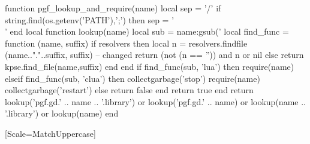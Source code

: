\usepackage[hidelinks]{hyperref}
\usepackage{longtable}
\usepackage{booktabs}
\usepackage{biocon}
\usepackage{graphicx}
\usepackage{fancyhdr}
\usepackage[T1]{fontenc}
\usepackage[francais]{babel}
\usepackage{caption}
\usepackage[nointegrals]{wasysym} %
\usepackage[margin=2.5cm]{geometry}
\usepackage{latexsym}
\usepackage{subcaption}
\usepackage{tikz}
\usepackage{tikzscale}
\usetikzlibrary{graphs}
\usetikzlibrary{graphdrawing}
\usetikzlibrary{arrows,positioning,decorations.pathreplacing}
\usetikzlibrary{calc}

\usepackage{luacode}
\begin{luacode}
  function pgf_lookup_and_require(name)
    local sep = '/'
    if string.find(os.getenv('PATH'),';') then
      sep = '\string\\'
    end
    local function lookup(name)
      local sub = name:gsub('%
      local find_func = function (name, suffix)
        if resolvers then
          local n = resolvers.findfile (name.."."..suffix, suffix) -- changed
          return (not (n == '')) and n or nil
        else
          return kpse.find_file(name,suffix)
        end
      end
      if find_func(sub, 'lua') then
        require(name)
      elseif find_func(sub, 'clua') then
        collectgarbage('stop')
        require(name)
        collectgarbage('restart')
      else
        return false
      end
      return true
    end
    return
      lookup('pgf.gd.' .. name .. '.library') or
      lookup('pgf.gd.' .. name) or
      lookup(name .. '.library') or
      lookup(name)
  end
\end{luacode}


\usetikzlibrary{quotes}
\usepackage{enumitem}
\providecommand{\tightlist}{%
  \setlength{\itemsep}{0pt}\setlength{\parskip}{0pt}}
\newcommand*{\TakeFourierOrnament}[1]{{%
\fontencoding{U}\fontfamily{futs}\selectfont\char#1}}
\newcommand*{\danger}{\TakeFourierOrnament{66}}
\usepackage{amsmath,fontspec,newunicodechar}
[Scale=MatchUppercase]
\usepackage{fontspec} %
\usepackage{fontawesome}
\newcommand{\tabitem}{~~\llap{\textbullet}~~}
\setcounter{secnumdepth}{0}
\setcounter{tocdepth}{1}
\pagestyle{fancy}
\fancyhf{}
\fancyhead[L]{\leftmark}
\fancyhead[R]{\thepage}
\renewcommand{\sectionmark}[1]{%
  \markboth{\textit{#1}}{}}
\usepackage[stable]{footmisc}
\usepackage{chemformula}

